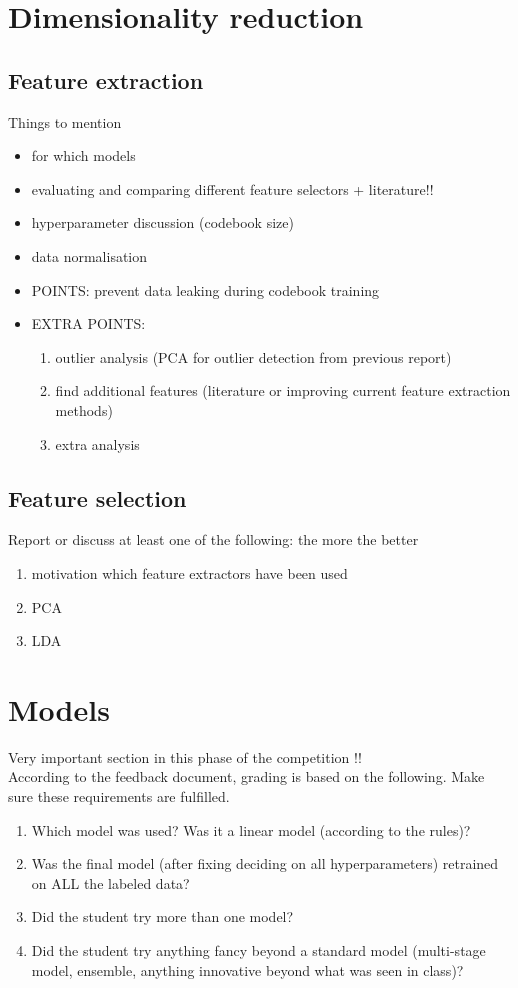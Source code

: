 \documentclass[8pt, a4]{article}
\begin{document}
	\section{Dimensionality reduction}
	\subsection{Feature extraction}
	Things to mention 
	\begin{itemize}
		\item for which models
		\item evaluating and comparing different feature selectors + literature!!
		\item hyperparameter discussion (codebook size) 
		\item data normalisation
		\item POINTS: prevent data leaking during codebook training
		\item EXTRA POINTS: 
			\begin{enumerate}
			\item 	outlier analysis (PCA for outlier detection  from previous report) 
			\item  find additional features (literature or improving current feature extraction methods)
			\item extra analysis
		\end{enumerate}
	\end{itemize}

	\subsection{Feature selection}
	Report or discuss at least one of the following: the more the better  \\
	\begin{enumerate}
		\item motivation which feature extractors have been used
		\item PCA
		\item LDA
	\end{enumerate}
	\section{Models}
	Very important section in this phase of the competition !! \\
	According to the feedback document, grading is based on the following. Make sure these requirements are fulfilled.
	\begin{enumerate}
		\item Which model was used? Was it a linear model (according to the rules)?
		\item Was the final model (after fixing deciding on all hyperparameters) retrained on ALL the
		labeled data?
		\item Did the student try more than one model?
		\item Did the student try anything fancy beyond a standard model (multi-stage model, ensemble,
		anything innovative beyond what was seen in class)?
	\end{enumerate}
	
\end{document}
